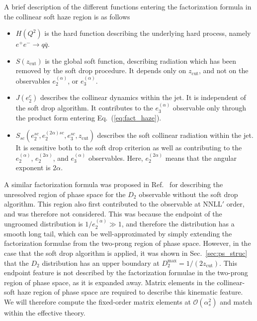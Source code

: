 \documentclass[a4paper,11pt]{article}
\newcommand{\ecf}[2]{e_{#1}^{(#2)}}
\def\zcut{z_{\text{cut}}}
\DeclareRobustCommand{\Sec}[1]{Sec.~\ref{#1}}
\DeclareRobustCommand{\Eq}[1]{Eq.~(\ref{#1})}
\DeclareRobustCommand{\Ref}[1]{Ref.~\cite{#1}}
\begin{document}
A brief description of the different functions entering the factorization formula in the collinear soft haze region is as follows
\begin{itemize}
\item $H(Q^2)$  is the hard function describing the underlying hard process, namely $e^+e^- \to q\bar q$.

\item $S(\zcut)$ is the global soft function, describing radiation which has been removed by the soft drop procedure. It depends only on $\zcut$, and not on the observables $\ecf{2}{\alpha}$, or $\ecf{3}{\alpha}$.

\item $J(e_2^c)$ describes the collinear dynamics within the jet. It is independent of the soft drop algorithm. It contributes to the $\ecf{3}{\alpha}$ observable only through the product form entering \Eq{eq:fact_haze}.

\item $S_{sc}(e_2^{sc},e_2^{(2\alpha) sc}, e_3^{sc}, \zcut)$ describes the soft collinear radiation within the jet. It is sensitive both to the soft drop criterion as well as contributing to the $\ecf{2}{\alpha}$, $\ecf{2}{2\alpha}$, and $\ecf{3}{\alpha}$ observables.  Here, $\ecf{2}{2\alpha}$ means that the angular exponent is $2\alpha$.

\end{itemize}

A similar factorization formula was proposed in \Ref{Larkoski:2015kga} for describing the unresolved region of phase space for the $D_2$ observable without the soft drop algorithm. This region also first contributed to the observable at NNLL$'$ order, and was therefore not considered. This was because the endpoint of the ungroomed distribution is $1/\ecf{2}{\alpha}\gg1$, and therefore the distribution has a smooth long tail, which can be well-approximated by simply extending the factorization formulae from the two-prong region of phase space. However, in the case that the soft drop algorithm is applied, it was shown in \Sec{sec:ps_struc} that the $D_2$ distribution has an upper boundary at $D_2^{\max} =1/(2\zcut)$. This endpoint feature is not described by the factorization formulae in the two-prong region of phase space, as it is expanded away. Matrix elements in the collinear-soft haze region of phase space are required to describe this kinematic feature. We will therefore compute the fixed-order matrix elements at $\mathcal{O}(\alpha_s^2)$ and match within the effective theory.
\end{document}

